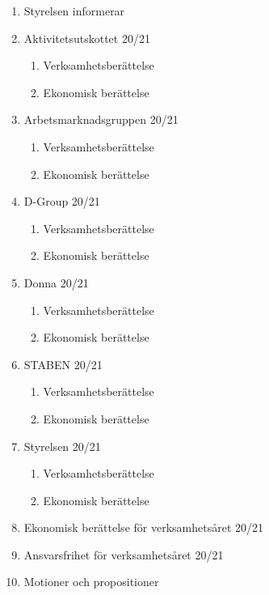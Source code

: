 \documentclass{datateknologsektionen-document}
\begin{document}
\begin{enumerate}[topsep=0pt,itemsep=1ex]
  \item Styrelsen informerar
  \item Aktivitetsutskottet 20/21
        \begin{enumerate}[label*=\arabic*.,leftmargin=3em]
          \item Verksamhetsberättelse
          \item Ekonomisk berättelse
        \end{enumerate}
  \item Arbetsmarknadsgruppen 20/21
        \begin{enumerate}[label*=\arabic*.,leftmargin=3em]
          \item Verksamhetsberättelse
          \item Ekonomisk berättelse
        \end{enumerate}
  \item D-Group 20/21
        \begin{enumerate}[label*=\arabic*.,leftmargin=3em]
          \item Verksamhetsberättelse
          \item Ekonomisk berättelse
        \end{enumerate}
  \item Donna 20/21
        \begin{enumerate}[label*=\arabic*.,leftmargin=3em]
          \item Verksamhetsberättelse
          \item Ekonomisk berättelse
        \end{enumerate}
  \item STABEN 20/21
        \begin{enumerate}[label*=\arabic*.,leftmargin=3em]
          \item Verksamhetsberättelse
          \item Ekonomisk berättelse
        \end{enumerate}
  \item Styrelsen 20/21
        \begin{enumerate}[label*=\arabic*.,leftmargin=3em]
          \item Verksamhetsberättelse
          \item Ekonomisk berättelse
        \end{enumerate}
  \item Ekonomisk berättelse för verksamhetsåret 20/21
  \item Ansvarsfrihet för verksamhetsåret 20/21
  \item Motioner och propositioner

\end{enumerate}
\end{document}
